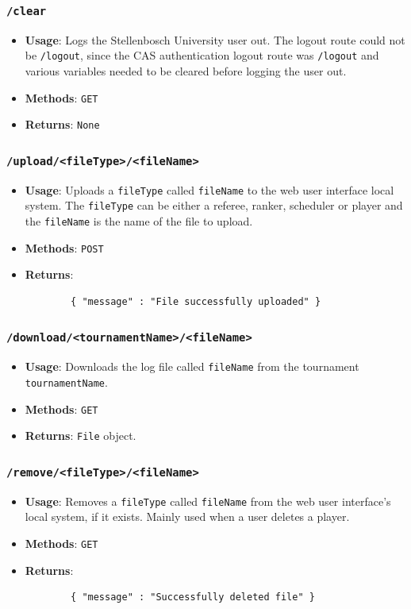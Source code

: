 \documentclass[a4paper, 11pt]{report}
\begin{document}
\subsubsection*{\texttt{/clear}}
\begin{itemize}
	\item \textbf{Usage}: Logs the Stellenbosch University user out. The logout
	route could not be \texttt{/logout}, since the CAS authentication logout route
	was \texttt{/logout} and various variables needed to be cleared before logging
	the user out.
	\item \textbf{Methods}: \texttt{GET}
	\item \textbf{Returns}: \texttt{None}
\end{itemize}
\subsubsection*{\texttt{/upload/<fileType>/<fileName>}}
\begin{itemize}
	\item \textbf{Usage}: Uploads a \texttt{fileType} called \texttt{fileName}
	to the web user interface local system. The \texttt{fileType} can be either
	a referee, ranker, scheduler or player and the \texttt{fileName} is the name
	of the file to upload.
	\item \textbf{Methods}: \texttt{POST}
	\item \textbf{Returns}:
	\begin{verbatim}
		{ "message" : "File successfully uploaded" }
	\end{verbatim}
\end{itemize}
\subsubsection*{\texttt{/download/<tournamentName>/<fileName>}}
\begin{itemize}
	\item \textbf{Usage}: Downloads the log file called \texttt{fileName} from
	the tournament \texttt{tournamentName}.
	\item \textbf{Methods}: \texttt{GET}
	\item \textbf{Returns}: \texttt{File} object.
\end{itemize}
\subsubsection*{\texttt{/remove/<fileType>/<fileName>}}
\begin{itemize}
	\item \textbf{Usage}: Removes a \texttt{fileType} called \texttt{fileName}
	from the web user interface's local system, if it exists. Mainly used when
	a user deletes a player.
	\item \textbf{Methods}: \texttt{GET}
	\item \textbf{Returns}:
	\begin{verbatim}
		{ "message" : "Successfully deleted file" }
	\end{verbatim}
\end{itemize}
\end{document}
